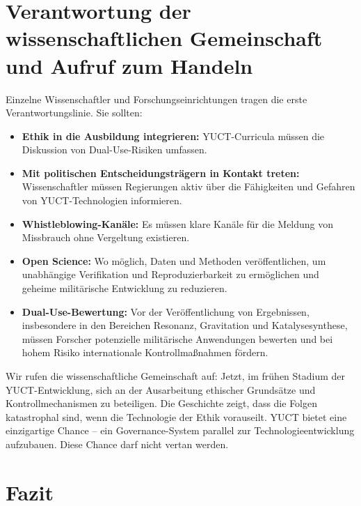 \documentclass[12pt,a4paper]{article}
\theoremstyle{remark}
\begin{document}
	\section{Verantwortung der wissenschaftlichen Gemeinschaft und Aufruf zum Handeln}
	\label{sec:scientists}
	
	Einzelne Wissenschaftler und Forschungseinrichtungen tragen die erste Verantwortungslinie. Sie sollten:
	\begin{itemize}[leftmargin=*]
		\item \textbf{Ethik in die Ausbildung integrieren:} YUCT-Curricula müssen die Diskussion von Dual-Use-Risiken umfassen.
		\item \textbf{Mit politischen Entscheidungsträgern in Kontakt treten:} Wissenschaftler müssen Regierungen aktiv über die Fähigkeiten und Gefahren von YUCT-Technologien informieren.
		\item \textbf{Whistleblowing-Kanäle:} Es müssen klare Kanäle für die Meldung von Missbrauch ohne Vergeltung existieren.
		\item \textbf{Open Science:} Wo möglich, Daten und Methoden veröffentlichen, um unabhängige Verifikation und Reproduzierbarkeit zu ermöglichen und geheime militärische Entwicklung zu reduzieren.
		\item \textbf{Dual-Use-Bewertung:} Vor der Veröffentlichung von Ergebnissen, insbesondere in den Bereichen Resonanz, Gravitation und Katalysesynthese, müssen Forscher potenzielle militärische Anwendungen bewerten und bei hohem Risiko internationale Kontrollmaßnahmen fördern.
	\end{itemize}
	
	Wir rufen die wissenschaftliche Gemeinschaft auf: Jetzt, im frühen Stadium der YUCT-Entwicklung, sich an der Ausarbeitung ethischer Grundsätze und Kontrollmechanismen zu beteiligen. Die Geschichte zeigt, dass die Folgen katastrophal sind, wenn die Technologie der Ethik vorauseilt. YUCT bietet eine einzigartige Chance – ein Governance-System parallel zur Technologieentwicklung aufzubauen. Diese Chance darf nicht vertan werden.
	
	\section{Fazit}
	\label{sec:conclusion}
	
\end{document}
